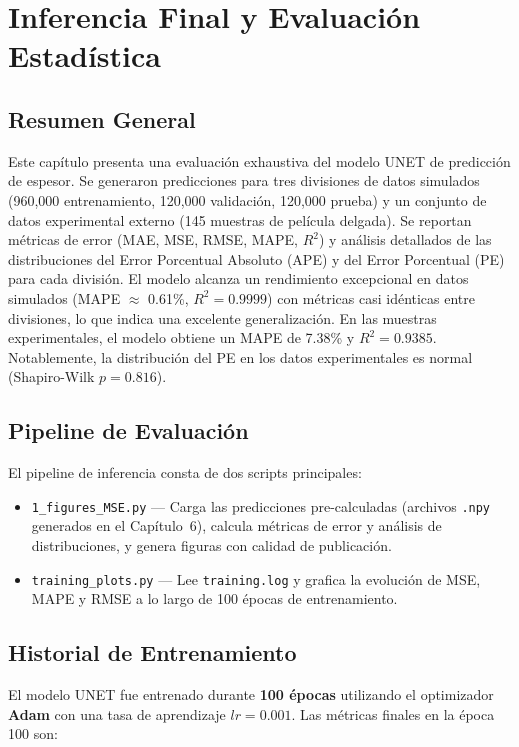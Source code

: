 \documentclass{article}
\begin{document}
\section{Inferencia Final y Evaluación Estadística}
\label{sec:final-eval}

\subsection{Resumen General}

Este capítulo presenta una evaluación exhaustiva del modelo UNET de predicción de espesor. Se generaron predicciones para tres divisiones de datos simulados (960,000 entrenamiento, 120,000 validación, 120,000 prueba) y un conjunto de datos experimental externo (145 muestras de película delgada). Se reportan métricas de error (MAE, MSE, RMSE, MAPE, $R^2$) y análisis detallados de las distribuciones del Error Porcentual Absoluto (APE) y del Error Porcentual (PE) para cada división. El modelo alcanza un rendimiento excepcional en datos simulados (MAPE $\approx$ 0.61\%, $R^2 = 0.9999$) con métricas casi idénticas entre divisiones, lo que indica una excelente generalización. En las muestras experimentales, el modelo obtiene un MAPE de 7.38\% y $R^2 = 0.9385$. Notablemente, la distribución del PE en los datos experimentales es normal (Shapiro-Wilk $p = 0.816$).

\subsection{Pipeline de Evaluación}
El pipeline de inferencia consta de dos scripts principales:
\begin{itemize}
\item \texttt{1\_figures\_MSE.py} — Carga las predicciones pre-calculadas (archivos \texttt{.npy} generados en el Capítulo~6), calcula métricas de error y análisis de distribuciones, y genera figuras con calidad de publicación.
\item \texttt{training\_plots.py} — Lee \texttt{training.log} y grafica la evolución de MSE, MAPE y RMSE a lo largo de 100 épocas de entrenamiento.
\end{itemize}

\subsection{Historial de Entrenamiento}
El modelo UNET fue entrenado durante \textbf{100 épocas} utilizando el optimizador \textbf{Adam} con una tasa de aprendizaje $lr = 0.001$. Las métricas finales en la época 100 son:
\end{document}
